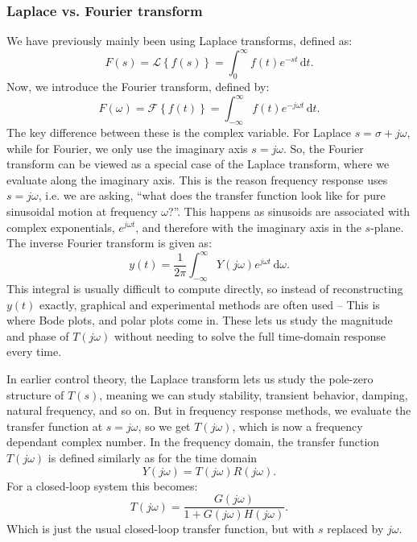 \subsubsection{Laplace vs. Fourier transform}
We have previously mainly been using Laplace transforms, defined as:
\begin{equation*}
  F(s) = \mathcal{L}\left\{ f(s) \right\} = \int_{0}^{\infty} f(t) e^{-st} \, \mathrm{d}t 
.\end{equation*}
Now, we introduce the Fourier transform, defined by:
\begin{equation*}
  F(\omega) = \mathcal{F}\left\{ f(t) \right\} = \int_{-\infty}^{\infty} f(t) e^{-j\omega t} \, \mathrm{d}t 
.\end{equation*}
The key difference between these is the complex variable.
For Laplace $s = \sigma + j\omega$, while for Fourier, we only use the imaginary axis $s = j\omega$.
So, the Fourier transform can be viewed as a special case of the Laplace transform, where we evaluate along the imaginary axis.
This is the reason frequency response uses $s = j\omega$, i.e. we are asking, ``what does the transfer function look like for pure sinusoidal motion at frequency $\omega$?''.
This happens as sinusoids are associated with complex exponentials, $e^{j\omega t}$, and therefore with the imaginary axis in the $s$-plane.
The inverse Fourier transform is given as:
\begin{equation*}
  y(t) = \frac{1}{2\pi} \int_{-\infty}^{\infty} Y(j\omega) e^{j\omega t} \, \mathrm{d}\omega
.\end{equation*}
This integral is usually difficult to compute directly, so instead of reconstructing $y(t)$ exactly, graphical and experimental methods are often used -- This is where Bode plots, and polar plots come in.
These lets us study the magnitude and phase of $T(j\omega)$ without needing to solve the full time-domain response every time.

In earlier control theory, the Laplace transform lets us study the pole-zero structure of $T(s)$, meaning we can study stability, transient behavior, damping, natural frequency, and so on.
But in frequency response methods, we evaluate the transfer function at $s = j\omega$, so we get $T(j\omega)$, which is now a frequency dependant complex number.
In the frequency domain, the transfer function $T(j\omega)$ is defined similarly as for the time domain
\begin{equation*}
  Y(j\omega) = T(j\omega)R(j\omega)
.\end{equation*}
For a closed-loop system this becomes:
\begin{equation*}
  T(j\omega) = \frac{G(j\omega)}{1 + G(j\omega) H(j\omega)}
.\end{equation*}
Which is just the usual closed-loop transfer function, but with $s$ replaced by $j\omega$.

